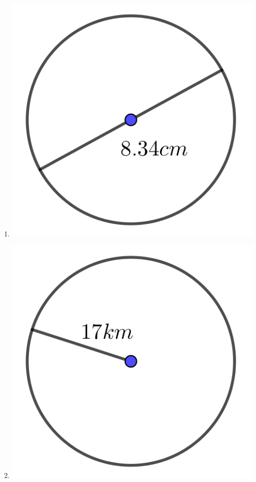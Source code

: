 \begin{multicols}{2}
\begin{enumerate}
	\item \includegraphics{./Images/Measurement/CircleAreaEx3.png}
	\item \includegraphics{./Images/Measurement/CircleAreaEx4.png}

\end{enumerate}
\end{multicols}
